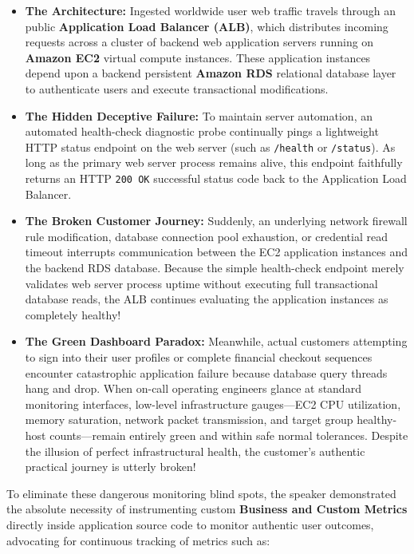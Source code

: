 \begin{itemize}
\tightlist
\item
  \textbf{The Architecture:} Ingested worldwide user web traffic travels
  through an public \textbf{Application Load Balancer (ALB)}, which
  distributes incoming requests across a cluster of backend web
  application servers running on \textbf{Amazon EC2} virtual compute
  instances. These application instances depend upon a backend
  persistent \textbf{Amazon RDS} relational database layer to
  authenticate users and execute transactional modifications.
\item
  \textbf{The Hidden Deceptive Failure:} To maintain server automation,
  an automated health-check diagnostic probe continually pings a
  lightweight HTTP status endpoint on the web server (such as
  \texttt{/\allowbreak{}health} or \texttt{/\allowbreak{}status}). As long as the primary web
  server process remains alive, this endpoint faithfully returns an HTTP
  \texttt{200\ OK} successful status code back to the Application Load
  Balancer.
\item
  \textbf{The Broken Customer Journey:} Suddenly, an underlying network
  firewall rule modification, database connection pool exhaustion, or
  credential read timeout interrupts communication between the EC2
  application instances and the backend RDS database. Because the simple
  health-check endpoint merely validates web server process uptime
  without executing full transactional database reads, the ALB continues
  evaluating the application instances as completely healthy!
\item
  \textbf{The Green Dashboard Paradox:} Meanwhile, actual customers
  attempting to sign into their user profiles or complete financial
  checkout sequences encounter catastrophic application failure because
  database query threads hang and drop. When on-call operating engineers
  glance at standard monitoring interfaces, low-level infrastructure
  gauges---EC2 CPU utilization, memory saturation, network packet
  transmission, and target group healthy-host counts---remain entirely
  green and within safe normal tolerances. Despite the illusion of
  perfect infrastructural health, the customer's authentic practical
  journey is utterly broken!
\end{itemize}

To eliminate these dangerous monitoring blind spots, the speaker
demonstrated the absolute necessity of instrumenting custom
\textbf{Business and Custom Metrics} directly inside application source
code to monitor authentic user outcomes, advocating for continuous
tracking of metrics such as:

